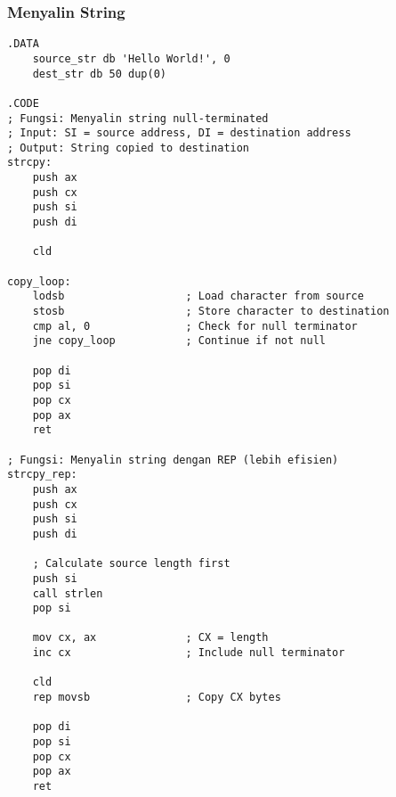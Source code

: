\documentclass[../main.tex]{subfiles}
\begin{document}
            \subsubsection{Menyalin String}
                \begin{lstlisting}[language={[x86masm]Assembler}, caption=Menyalin String, label={lst:string-copy}]
.DATA
    source_str db 'Hello World!', 0
    dest_str db 50 dup(0)

.CODE
; Fungsi: Menyalin string null-terminated
; Input: SI = source address, DI = destination address
; Output: String copied to destination
strcpy:
    push ax
    push cx
    push si
    push di
    
    cld
    
copy_loop:
    lodsb                   ; Load character from source
    stosb                   ; Store character to destination
    cmp al, 0               ; Check for null terminator
    jne copy_loop           ; Continue if not null
    
    pop di
    pop si
    pop cx
    pop ax
    ret

; Fungsi: Menyalin string dengan REP (lebih efisien)
strcpy_rep:
    push ax
    push cx
    push si
    push di
    
    ; Calculate source length first
    push si
    call strlen
    pop si
    
    mov cx, ax              ; CX = length
    inc cx                  ; Include null terminator
    
    cld
    rep movsb               ; Copy CX bytes
    
    pop di
    pop si
    pop cx
    pop ax
    ret
                \end{lstlisting}
\end{document}
